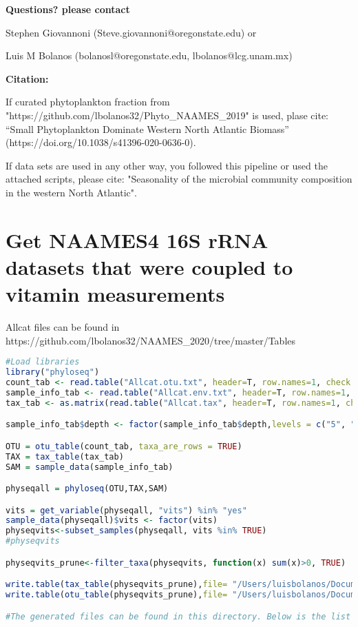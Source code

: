 \documentclass{article}
\begin{document}
\textbf{Questions? please contact}
\begin{description}\sloppy
\item[$\bullet$] Stephen Giovannoni (Steve.giovannoni@oregonstate.edu) or
\item[$\bullet$] Luis M Bolanos (bolanosl@oregonstate.edu, lbolanos@lcg.unam.mx) 
\end{description}

\textbf {Citation:}
\begin{description}\sloppy
\item[$\bullet$]If curated phytoplankton fraction from "https://github.com/lbolanos32/Phyto\_NAAMES\_2019" is used, plase cite: “Small Phytoplankton Dominate Western North Atlantic Biomass” (https://doi.org/10.1038/s41396-020-0636-0).

\item[$\bullet$]If data sets are used in any other way, you followed this pipeline or used the attached scripts, please cite: "Seasonality of the microbial community composition in the western North Atlantic".
\end{description}

\section{Get NAAMES4 16S rRNA datasets that were coupled to vitamin measurements} 

Allcat files can be found in https://github.com/lbolanos32/NAAMES\_2020/tree/master/Tables
\begin{lstlisting}[language=R,caption={Extract 16S rRNA with vitamin measurements}]
#Load libraries
library("phyloseq")
count_tab <- read.table("Allcat.otu.txt", header=T, row.names=1, check.names=F)
sample_info_tab <- read.table("Allcat.env.txt", header=T, row.names=1, check.names=F, sep ="\t")
tax_tab <- as.matrix(read.table("Allcat.tax", header=T, row.names=1, check.names=F, na.strings="", sep="\t"))

sample_info_tab$depth <- factor(sample_info_tab$depth,levels = c("5", "25", "50", "75", "100","150","200","300"))

OTU = otu_table(count_tab, taxa_are_rows = TRUE)
TAX = tax_table(tax_tab)
SAM = sample_data(sample_info_tab)

physeqall = phyloseq(OTU,TAX,SAM)

vits = get_variable(physeqall, "vits") %in% "yes"
sample_data(physeqall)$vits <- factor(vits)
physeqvits<-subset_samples(physeqall, vits %in% TRUE)
#physeqvits

physeqvits_prune<-filter_taxa(physeqvits, function(x) sum(x)>0, TRUE)

write.table(tax_table(physeqvits_prune),file= "/Users/luisbolanos/Documents/OSU_postdoc/NAAMES/Vits_Chris/vitsf.tax", quote=FALSE, sep = "\t")
write.table(otu_table(physeqvits_prune),file= "/Users/luisbolanos/Documents/OSU_postdoc/NAAMES/Vits_Chris/vitfs.otu", quote=FALSE, sep = "\t")

#The generated files can be found in this directory. Below is the list of Rscripts used to generate the figures in the manuscript. 

\end{lstlisting}
\end{document}
